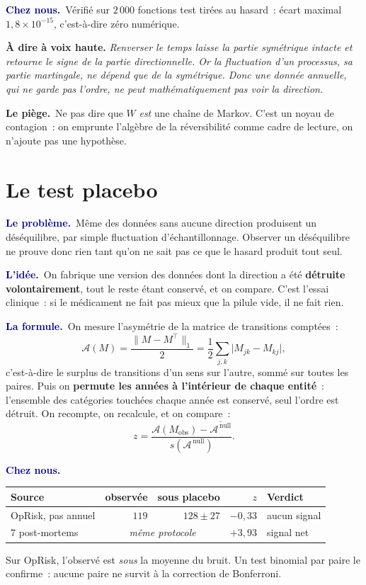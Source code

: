 \documentclass[11pt,a4paper]{article}
\newcommand{\lequoi}[1]{\smallskip\noindent\textcolor{navy}{\textbf{Le problème.}}\ #1\par}
\newcommand{\lidee}[1]{\smallskip\noindent\textcolor{navy}{\textbf{L'idée.}}\ #1\par}
\newcommand{\laformule}[1]{\smallskip\noindent\textcolor{navy}{\textbf{La formule.}}\ #1\par}
\newcommand{\cheznous}[1]{\smallskip\noindent\textcolor{navy}{\textbf{Chez nous.}}\ #1\par}
\newcommand{\lepiege}[1]{\smallskip\noindent\textcolor{accent}{\textbf{Le piège.}}\ #1\par}
\newcommand{\laphrase}[1]{\begin{phrasebox}\textbf{À dire à voix haute.} \emph{#1}\end{phrasebox}}
\begin{document}
\cheznous{Vérifié sur $2\,000$ fonctions test tirées au hasard~: écart maximal
$1{,}8\times10^{-15}$, c'est-à-dire zéro numérique.}

\laphrase{Renverser le temps laisse la partie symétrique intacte et retourne le signe de la
partie directionnelle. Or la fluctuation d'un processus, sa partie martingale, ne dépend que
de la symétrique. Donc une donnée annuelle, qui ne garde pas l'ordre, ne peut
mathématiquement pas voir la direction.}

\lepiege{Ne pas dire que $W$ \emph{est} une chaîne de Markov. C'est un noyau de contagion~:
on emprunte l'algèbre de la réversibilité comme cadre de lecture, on n'ajoute pas une
hypothèse.}

\section{Le test placebo}
\label{sec:placebo}

\lequoi{Même des données sans aucune direction produisent un déséquilibre, par simple
fluctuation d'échantillonnage. Observer un déséquilibre ne prouve donc rien tant qu'on ne
sait pas ce que le hasard produit tout seul.}

\lidee{On fabrique une version des données dont la direction a été \textbf{détruite
volontairement}, tout le reste étant conservé, et on compare. C'est l'essai clinique~: si le
médicament ne fait pas mieux que la pilule vide, il ne fait rien.}

\laformule{On mesure l'asymétrie de la matrice de transitions comptées~:
\[
  \mathcal{A}(M)=\frac{\|M-M^{\top}\|_1}{2}
  =\frac12\sum_{j,k}\bigl|M_{jk}-M_{kj}\bigr| ,
\]
c'est-à-dire le surplus de transitions d'un sens sur l'autre, sommé sur toutes les paires.
Puis on \textbf{permute les années à l'intérieur de chaque entité}~: l'ensemble des
catégories touchées chaque année est conservé, seul l'ordre est détruit. On recompte, on
recalcule, et on compare~:
\[
  z=\frac{\mathcal{A}(M_{\text{obs}})-\overline{\mathcal{A}^{\,\text{null}}}}
        {\widehat{s}(\mathcal{A}^{\,\text{null}})} .
\]}

\cheznous{
\begin{center}\small
\begin{tabular}{@{}l r r r l@{}}
\toprule
\textbf{Source} & \textbf{observée} & \textbf{sous placebo} & \textbf{$z$} & \textbf{Verdict}\\
\midrule
OpRisk, pas annuel & $119$ & $128\pm27$ & $-0{,}33$ & aucun signal \\
7 post-mortems & \multicolumn{2}{c}{\emph{même protocole}} & $+3{,}93$ & signal net \\
\bottomrule
\end{tabular}
\end{center}
Sur OpRisk, l'observé est \emph{sous} la moyenne du bruit. Un test binomial par paire le
confirme~: aucune paire ne survit à la correction de Bonferroni.}
\end{document}

